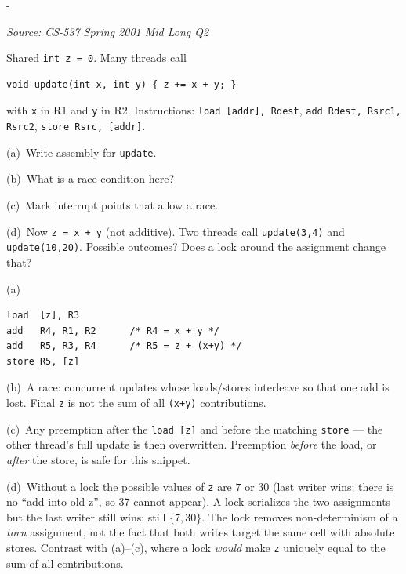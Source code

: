 \documentclass[11pt,a4paper]{article}
\makeatletter
\newcommand{\keepspace}[1]{\par\penalty-100\begingroup
  \setlength{\dimen@}{#1}\dimen@ii\pagegoal\advance\dimen@ii-\pagetotal
  \ifdim\dimen@>\dimen@ii\ifdim\dimen@ii>\z@\vfil\fi\break\fi\endgroup}
\newcounter{qn}[section]
\newenvironment{Qn}[4]{%
  \refstepcounter{qn}\keepspace{7\baselineskip}%
  \begin{tcolorbox}[qboxstyle, title={Q\thesection.\theqn\ \ [#1 \textbar\ #2]\ \ #4}]%
  {\footnotesize\color{g3}\textit{Source: #3}}\par\smallskip%
}{%
  \end{tcolorbox}%
}
\newenvironment{Sol}{%
  \begin{tcolorbox}[sboxstyle, title={Solution}]%
}{%
  \end{tcolorbox}\vspace{0.35em}%
}
\makeatother
\begin{document}
\begin{Qn}{Hard}{Lect 16}{CS-537 Spring 2001 Mid Long Q2}{Race to the Finish}
Shared \texttt{int z = 0}. Many threads call

\begin{lstlisting}[numbers=none]
void update(int x, int y) { z += x + y; }
\end{lstlisting}

with \texttt{x} in R1 and \texttt{y} in R2. Instructions: \texttt{load [addr], Rdest}, \texttt{add Rdest, Rsrc1, Rsrc2}, \texttt{store Rsrc, [addr]}.

(a)~Write assembly for \texttt{update}.

(b)~What is a race condition here?

(c)~Mark interrupt points that allow a race.

(d)~Now \texttt{z = x + y} (not additive). Two threads call \texttt{update(3,4)} and \texttt{update(10,20)}. Possible outcomes? Does a lock around the assignment change that?
\end{Qn}
\begin{Sol}
(a)
\begin{lstlisting}[numbers=none]
load  [z], R3
add   R4, R1, R2      /* R4 = x + y */
add   R5, R3, R4      /* R5 = z + (x+y) */
store R5, [z]
\end{lstlisting}

(b)~A race: concurrent updates whose loads/stores interleave so that one add is lost. Final \texttt{z} is not the sum of all \texttt{(x+y)} contributions.

(c)~Any preemption after the \texttt{load [z]} and before the matching \texttt{store} --- the other thread's full update is then overwritten. Preemption \emph{before} the load, or \emph{after} the store, is safe for this snippet.

(d)~Without a lock the possible values of \texttt{z} are $7$ or $30$ (last writer wins; there is no ``add into old z'', so 37 cannot appear). A lock serializes the two assignments but the last writer still wins: still $\{7,30\}$. The lock removes non-determinism of a \emph{torn} assignment, not the fact that both writes target the same cell with absolute stores. Contrast with (a)--(c), where a lock \emph{would} make \texttt{z} uniquely equal to the sum of all contributions.
\end{Sol}
\end{document}
